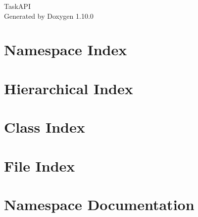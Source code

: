 \documentclass[twoside]{book}
\newcommand{\+}{\discretionary{\mbox{\scriptsize$\hookleftarrow$}}{}{}}
\newcommand{\clearemptydoublepage}{%
    \newpage{\pagestyle{empty}\cleardoublepage}%
  }
\begin{document}
  \raggedbottom
    \hypersetup{pageanchor=false,
                bookmarksnumbered=true,
                pdfencoding=unicode
               }
  \begin{titlepage}
  \vspace*{7cm}
  \begin{center}%
  {\Large Task\+API}\\
  \vspace*{1cm}
  {\large Generated by Doxygen 1.10.0}\\
  \end{center}
  \end{titlepage}
  \clearemptydoublepage
  \tableofcontents
  \clearemptydoublepage
  \hypersetup{pageanchor=true}
\chapter{Namespace Index}

\chapter{Hierarchical Index}

\chapter{Class Index}

\chapter{File Index}

\chapter{Namespace Documentation}













\end{document}
